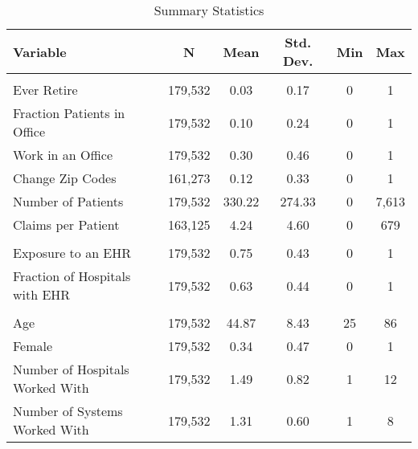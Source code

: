 


\begin{table}[ht]

\caption{Summary Statistics}
\centering
\begin{tabular}[t]{lccccc}
\toprule
Variable & N & Mean & Std. Dev. & Min & Max\\
\midrule
\addlinespace[0.3em]
\multicolumn{6}{l}{\textbf{Outcomes}}\\
\hspace{1em}Ever Retire & 179,532 & 0.03 & 0.17 & 0 & 1\\
\hspace{1em}Fraction Patients in Office & 179,532 & 0.10 & 0.24 & 0 & 1\\
\hspace{1em}Work in an Office & 179,532 & 0.30 & 0.46 & 0 & 1\\
\hspace{1em}Change Zip Codes & 161,273 & 0.12 & 0.33 & 0 & 1\\
\hspace{1em}Number of Patients & 179,532 & 330.22 & 274.33 & 0 & 7,613\\
\hspace{1em}Claims per Patient & 163,125 & 4.24 & 4.60 & 0 & 679\\
\addlinespace[0.3em]
\multicolumn{6}{l}{\textbf{Treatment}}\\
\hspace{1em}Exposure to an EHR & 179,532 & 0.75 & 0.43 & 0 & 1\\
\hspace{1em}Fraction of Hospitals with EHR & 179,532 & 0.63 & 0.44 & 0 & 1\\
\addlinespace[0.3em]
\multicolumn{6}{l}{\textbf{Characteristics}}\\
\hspace{1em}Age & 179,532 & 44.87 & 8.43 & 25 & 86\\
\hspace{1em}Female & 179,532 & 0.34 & 0.47 & 0 & 1\\
\hspace{1em}Number of Hospitals Worked With & 179,532 & 1.49 & 0.82 & 1 & 12\\
\hspace{1em}Number of Systems Worked With & 179,532 & 1.31 & 0.60 & 1 & 8\\
\bottomrule
\end{tabular}
\end{table}
\label{tab:sumstats}